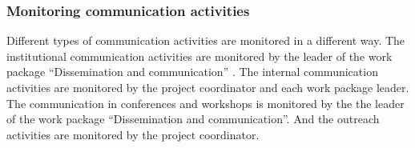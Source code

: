 \subsubsection*{Monitoring communication activities}

Different types of communication activities are monitored in a
different way.  The institutional communication activities are
monitored by the leader of the work package ``Dissemination and
communication'' . The internal communication activities are monitored
by the project coordinator and each work package leader. The communication 
in conferences and workshops is monitored by the 
the leader of the work package ``Dissemination and
communication''. And the outreach activities are monitored by the 
project coordinator.

